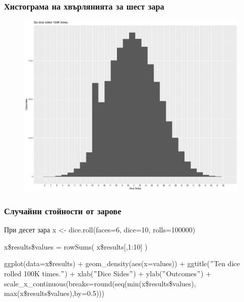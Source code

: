 \documentclass{beamer}
\begin{document}
\begin{frame}
\frametitle{Хистограма на хвърлянията за шест зара}
\begin{figure}[]\includegraphics[width=\textwidth,height=0.75\textheight]{pic0049}\end{figure}
\end{frame}

\begin{frame}
\frametitle{Случайни стойности от зарове}
\begin{block}{При десет зара}
x <- dice.roll(faces=6, dice=10, rolls=100000)

x\$results\$values = rowSums( x\$results[,1:10] )

ggplot(data=x\$results) + geom\_density(aes(x=values)) + ggtitle($"$Ten dice rolled 100K times.$"$) + xlab($"$Dice Sides$"$) + ylab($"$Outcomes$"$) + scale\_x\_continuous(breaks=round(seq(min(x\$results\$values), max(x\$results\$values),by=0.5)))
\end{block}
\end{frame}
\end{document}
